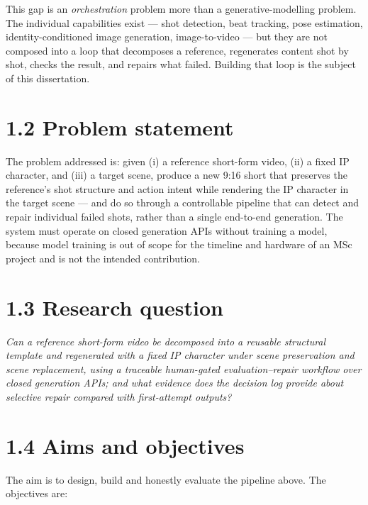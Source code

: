 \documentclass[10pt,twocolumn,letterpaper]{article}
\begin{document}
This gap is an \emph{orchestration} problem more than a generative-modelling problem. The individual capabilities exist --- shot detection, beat tracking, pose estimation, identity-conditioned image generation, image-to-video --- but they are not composed into a loop that decomposes a reference, regenerates content shot by shot, checks the result, and repairs what failed. Building that loop is the subject of this dissertation.


\section*{1.2 Problem statement}

The problem addressed is: given (i) a reference short-form video, (ii) a fixed IP character, and (iii) a target scene, produce a new 9:16 short that preserves the reference's shot structure and action intent while rendering the IP character in the target scene --- and do so through a controllable pipeline that can detect and repair individual failed shots, rather than a single end-to-end generation. The system must operate on closed generation APIs without training a model, because model training is out of scope for the timeline and hardware of an MSc project and is not the intended contribution.


\section*{1.3 Research question}

\emph{Can a reference short-form video be decomposed into a reusable structural template and regenerated with a fixed IP character under scene preservation and scene replacement, using a traceable human-gated evaluation--repair workflow over closed generation APIs; and what evidence does the decision log provide about selective repair compared with first-attempt outputs?}


\section*{1.4 Aims and objectives}

The aim is to design, build and honestly evaluate the pipeline above. The objectives are:
\end{document}
